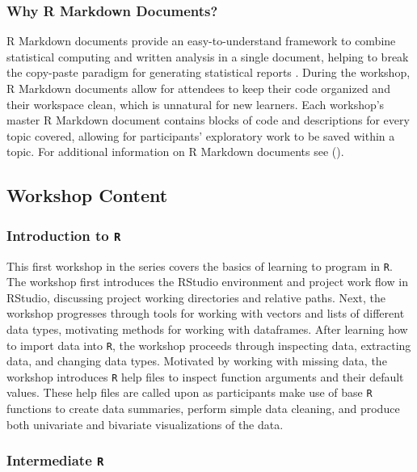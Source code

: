 \documentclass[12pt]{article}
\begin{document}
\subsubsection{Why R Markdown Documents?}

\quad R Markdown documents provide an easy-to-understand framework to combine
statistical computing and written analysis in a single document, helping to
break the copy-paste paradigm for generating statistical reports 
\citep{mine-rmarkdown}. During the workshop, R Markdown documents allow for 
attendees to keep their code organized and their workspace clean, which is
unnatural for new learners. Each workshop's master R Markdown document contains
blocks of code and descriptions for every topic covered, allowing for
participants' exploratory work to be saved within a topic. For additional
information on R Markdown documents see \citeauthor{mine-rmarkdown} 
(\citeyear{mine-rmarkdown}). 

\subsection{Workshop Content}

\subsubsection{Introduction to \texttt{R}}
\label{sec:introR}

\quad This first workshop in the series covers the basics of learning to program
in \texttt{R}. The workshop first introduces the RStudio environment and project
work flow in RStudio, discussing project working directories and relative paths.
Next, the workshop progresses through tools for working with vectors and lists 
of different data types, motivating methods for working with dataframes. After
learning how to import data into \texttt{R}, the workshop proceeds through
inspecting data, extracting data, and changing data types. Motivated by working
with missing data, the workshop introduces \texttt{R} help files to inspect
function arguments and their default values. These help files are called upon
as participants make use of base \texttt{R} functions to create data summaries,
perform simple data cleaning, and produce both univariate and bivariate
visualizations of the data. 

\subsubsection{Intermediate \texttt{R}}
\label{sec:intermed}
\end{document}

